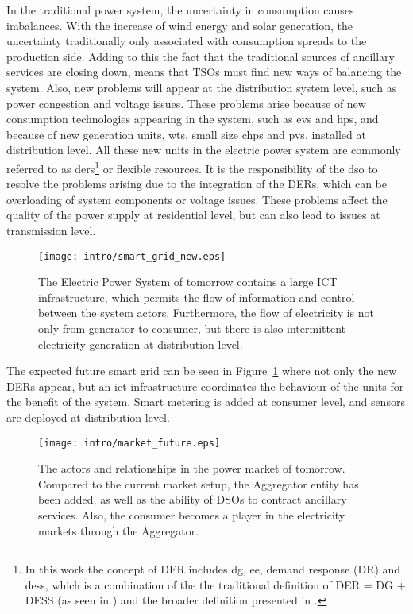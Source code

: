 In the traditional power system, the uncertainty in consumption causes imbalances. With the increase of wind energy and solar generation, the uncertainty traditionally only associated with consumption spreads to the production side. Adding to this the fact that the traditional sources of ancillary services are closing down, means that TSOs must find new ways of balancing the system. Also, new problems will appear at the distribution system level, such as power congestion and voltage issues. These problems arise because of new consumption technologies appearing in the system, such as \glspl{ev} and \glspl{hp}, and because of new generation units, \eg \glspl{wt}, small size \glspl{chp} and \glspl{pv}, installed at distribution level. All these new units in the electric power system are commonly referred to as \glspl{der}\footnote{In this work the concept of DER includes \gls{dg}, \gls{ee}, demand response (DR) and \gls{dess}, which is a combination of the the traditional definition of DER = DG + DESS (as seen in \eg \cite{nrel2002using}) and the broader definition presented in \cite{nys2014reforming}.} or flexible resources. It is the responsibility of the \gls{dso} to resolve the problems arising due to the integration of the DERs, which can be overloading of system components or voltage issues. These problems affect the quality of the power supply at residential level, but can also lead to issues at transmission level.
\begin{figure}[ht]
	\centering
	\caption{The Electric Power System of tomorrow contains a large ICT infrastructure, which permits the flow of information and control between the system actors. Furthermore, the flow of electricity is not only from generator to consumer, but there is also intermittent electricity generation at distribution level.}
	\texttt{[image: intro/smart\_grid\_new.eps]}\label{fig:powerfuture}
\end{figure}

The expected future smart grid can be seen in Figure~\ref{fig:powerfuture} where not only the new DERs appear, but an \Gls{ict} infrastructure coordinates the behaviour of the units for the benefit of the system. Smart metering is added at consumer level, and sensors are deployed at distribution level.
\begin{figure*}[htbp!]
	\centering
	\caption{The actors and relationships in the power market of tomorrow. Compared to the current market setup, the Aggregator entity has been added, as well as the ability of DSOs to contract ancillary services. Also, the consumer becomes a player in the electricity markets through the Aggregator.}
	\texttt{[image: intro/market\_future.eps]}\label{fig:marketfuture}
\end{figure*}

